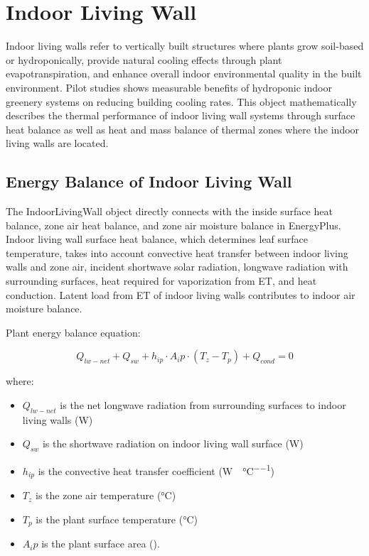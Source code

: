 \section{Indoor Living Wall }\label{indoor-living-wall}

Indoor living walls refer to vertically built structures where plants grow soil-based or hydroponically, provide natural cooling effects through plant evapotranspiration, and enhance overall indoor environmental quality in the built environment. Pilot studies shows measurable benefits of hydroponic indoor greenery systems on reducing building cooling rates. This object mathematically describes the thermal performance of indoor living wall systems through surface heat balance as well as heat and mass balance of thermal zones where the indoor living walls are located.

\subsection{Energy Balance of Indoor Living Wall}\label{energy-balance-of-indoor-living-wall}

The IndoorLivingWall object directly connects with the inside surface heat balance, zone air heat balance, and zone air moisture balance in EnergyPlus. Indoor living wall surface heat balance, which determines leaf surface temperature, takes into account convective heat transfer between indoor living walls and zone air, incident shortwave solar radiation, longwave radiation with surrounding surfaces, heat required for vaporization from ET, and heat conduction. Latent load from ET of indoor living walls contributes to indoor air moisture balance.

Plant energy balance equation:

\begin{equation}
Q_{lw-net}+Q_{sw}+h_{ip} \cdot A_ip \cdot (T_z - T_p )+Q_{cond}=0
\end{equation}

where:

\begin{itemize}
\tightlist
\item
  \(Q_{lw-net}\) is the net longwave radiation from surrounding surfaces to indoor living walls (\si{\watt})
\item
  \(Q_{sw}\) is the shortwave radiation on indoor living wall surface (\si{\watt})
\item
  \(h_{ip}\) is the convective heat transfer coefficient (\si{\watt\per\area\per\celsius})
\item
  \(T_z\) is the zone air temperature (\si{\celsius})
\item
  \(T_p\) is the plant surface temperature (\si{\celsius})
\item
  \(A_ip\) is the plant surface area (\si{\area}).
\end{itemize}

